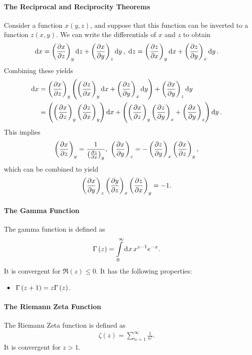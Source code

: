 \paragraph{The Reciprocal and Reciprocity Theorems}
Consider a function $x(y, z)$, and suppose that this function can be inverted to a function $z(x, y)$. We can write the differentials of $x$ and $z$ to obtain
\begin{align*}
	\dd{x} = \fix{\pdv{x}{z}}{y}\dd{z} + \fix{\pdv{x}{y}}{z}\dd{y},\ \dd{z} = \fix{\pdv{z}{x}}{y}\dd{x} + \fix{\pdv{z}{y}}{x}\dd{y}.
\end{align*}
Combining these yields
\begin{align*}
	\dd{x} &= \left(\pdv{x}{z}\right)_{y}\left(\left(\pdv{z}{x}\right)_{y}\dd{x} + \left(\pdv{z}{y}\right)_{x}\dd{y}\right) + \left(\pdv{x}{y}\right)_{z}\dd{y} \\
	       &= \left(\left(\pdv{x}{z}\right)_{y}\left(\pdv{z}{x}\right)_{y}\right)\dd{x} + \left(\left(\pdv{x}{z}\right)_{y}\left(\pdv{z}{y}\right)_{x} + \left(\pdv{x}{y}\right)_{z}\right)\dd{y}.
\end{align*}
This implies
\begin{align*}
	\fix{\pdv{x}{z}}{y} = \frac{1}{\fix{\pdv{z}{x}}{y}},\ \fix{\pdv{x}{y}}{z} = -\fix{\pdv{z}{y}}{x}\fix{\pdv{x}{z}}{y},
\end{align*}
which can be combined to yield
\begin{align*}
	 \left(\pdv{x}{y}\right)_{z}\left(\pdv{y}{z}\right)_{x}\left(\pdv{z}{x}\right)_{y} = -1.
\end{align*}

\paragraph{The Gamma Function}
The gamma function is defined as
\begin{align*}
	\Gamma\left(z\right) = \int\limits_{0}^{\infty}\dd[]{x}x^{z - 1}e^{-x}.
\end{align*}
It is convergent for $\Re(z) \leq 0$. It has the following properties:
\begin{itemize}
	\item $\Gamma\left(z + 1\right) = z\Gamma\left(z\right)$.
\end{itemize}

\paragraph{The Riemann Zeta Function}
The Riemann Zeta function is defined as
\begin{align*}
	\zeta(z) = \sum\limits_{n = 1}^{\infty}\frac{1}{n^{z}}.
\end{align*}
It is convergent for $z > 1$.

